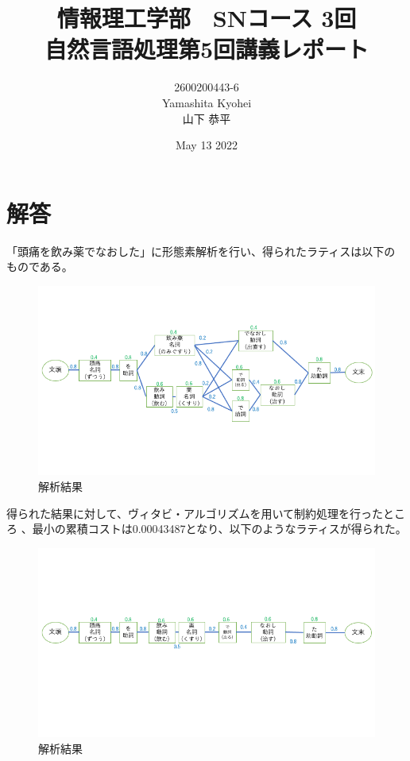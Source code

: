 \documentclass[dvipdfmx,autodetect-engine,titlepage]{jsarticle}
\title{情報理工学部　SNコース 3回\\
自然言語処理第5回講義レポート\\}
\author{2600200443-6\\Yamashita Kyohei\\山下 恭平}
\date{May 13 2022}
\begin{document}
\maketitle

\section{解答}

「頭痛を飲み薬でなおした」に形態素解析を行い、得られたラティスは以下の
ものである。

\begin{figure}[h]
  \centering
  \includegraphics[scale=0.4]{pic1.png}
  \caption{解析結果}
\end{figure}

得られた結果に対して、ヴィタビ・アルゴリズムを用いて制約処理を行ったところ
、最小の累積コストは0.00043487となり、以下のようなラティスが得られた。

\begin{figure}[h]
  \centering
  \includegraphics[scale=0.4]{pic21.png}
  \caption{解析結果}
\end{figure}
\end{document}
